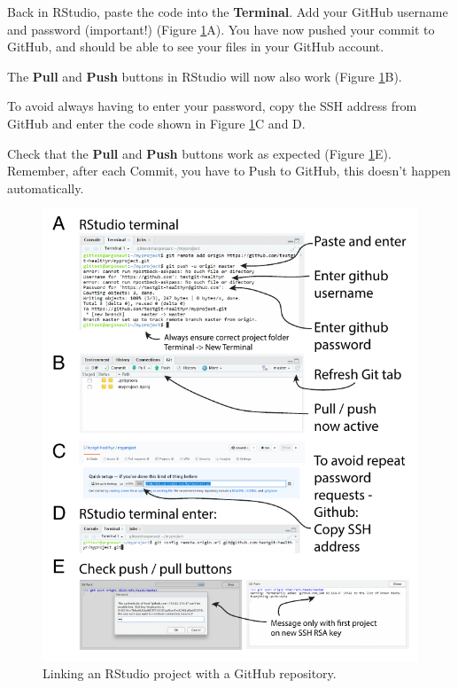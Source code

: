 \documentclass[
  12pt,
  krantz2]{krantz}
\begin{document}
Back in RStudio, paste the code into the \textbf{Terminal}.
Add your GitHub username and password (important!) (Figure \ref{fig:chap14-fig-link}A).
You have now pushed your commit to GitHub, and should be able to see your files in your GitHub account.


The \textbf{Pull} and \textbf{Push} buttons in RStudio will now also work (Figure \ref{fig:chap14-fig-link}B).

To avoid always having to enter your password, copy the SSH address from GitHub and enter the code shown in Figure \ref{fig:chap14-fig-link}C and D.

Check that the \textbf{Pull} and \textbf{Push} buttons work as expected (Figure \ref{fig:chap14-fig-link}E).
Remember, after each Commit, you have to Push to GitHub, this doesn't happen automatically.

\begin{figure}
\centering
\includegraphics{images/chapter14/6.pdf}
\caption{\label{fig:chap14-fig-link}Linking an RStudio project with a GitHub repository.}
\end{figure}
\end{document}
